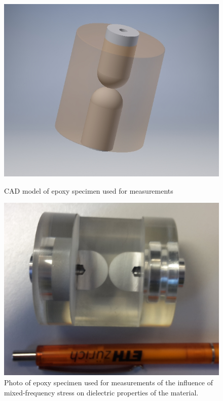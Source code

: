 \begin{figure}[!ht]
  \begin{minipage}{0.5\textwidth}
  

  
  \centerline{\includegraphics[height=0.2\textheight]{figures/intro/cad_epoxy}}
\caption{CAD model of epoxy specimen used for measurements}
	\label{fig.specimen}
	
	  \end{minipage}
	    \begin{minipage}{0.5\textwidth}
	  
  \centerline{\includegraphics[height=0.2\textheight]{figures/intro/photo_epoxy2}}
\caption{Photo of epoxy specimen used for measurements of the influence of mixed-frequency stress on dielectric properties of the material. \protect\footnotemark}
	\label{fig.specimenphoto}
	  
	   \end{minipage}
\end{figure}
